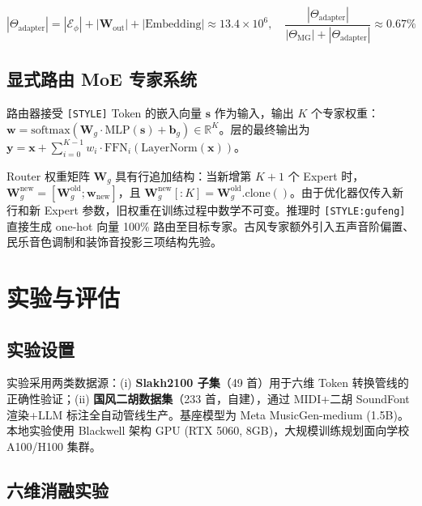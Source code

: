 \documentclass[11pt]{article}
\begin{document}
\begin{equation}
|\Theta_{\text{adapter}}| = |\mathcal{E}_{\phi}| + |\mathbf{W}_{\text{out}}| + |\text{Embedding}| \approx 13.4\times 10^6,\quad
\frac{|\Theta_{\text{adapter}}|}{|\Theta_{\text{MG}}| + |\Theta_{\text{adapter}}|} \approx 0.67\%
\end{equation}

\subsection{显式路由 MoE 专家系统}

路由器接受 \texttt{[STYLE]} Token 的嵌入向量 $\mathbf{s}$ 作为输入，输出 $K$ 个专家权重：$\mathbf{w} = \text{softmax}(\mathbf{W}_g \cdot \text{MLP}(\mathbf{s}) + \mathbf{b}_g) \in \mathbb{R}^{K}$。层的最终输出为 $\mathbf{y} = \mathbf{x} + \sum_{i=0}^{K-1} w_i \cdot \text{FFN}_i(\text{LayerNorm}(\mathbf{x}))$。

Router 权重矩阵 $\mathbf{W}_g$ 具有行追加结构：当新增第 $K+1$ 个 Expert 时，$\mathbf{W}_g^{\text{new}} = [\mathbf{W}_g^{\text{old}}; \mathbf{w}_{\text{new}}]$，且 $\mathbf{W}_g^{\text{new}}[:K] = \mathbf{W}_g^{\text{old}}.\text{clone}()$。由于优化器仅传入新行和新 Expert 参数，旧权重在训练过程中数学不可变。推理时 \texttt{[STYLE:gufeng]} 直接生成 one-hot 向量 100\% 路由至目标专家。古风专家额外引入五声音阶偏置、民乐音色调制和装饰音投影三项结构先验。


\section{实验与评估}

\subsection{实验设置}

实验采用两类数据源：(i) \textbf{Slakh2100 子集}（49 首）用于六维 Token 转换管线的正确性验证；(ii) \textbf{国风二胡数据集}（233 首，自建），通过 MIDI+二胡 SoundFont 渲染+LLM 标注全自动管线生产。基座模型为 Meta MusicGen-medium (1.5B)。本地实验使用 Blackwell 架构 GPU (RTX 5060, 8GB)，大规模训练规划面向学校 A100/H100 集群。

\subsection{六维消融实验}
\end{document}
